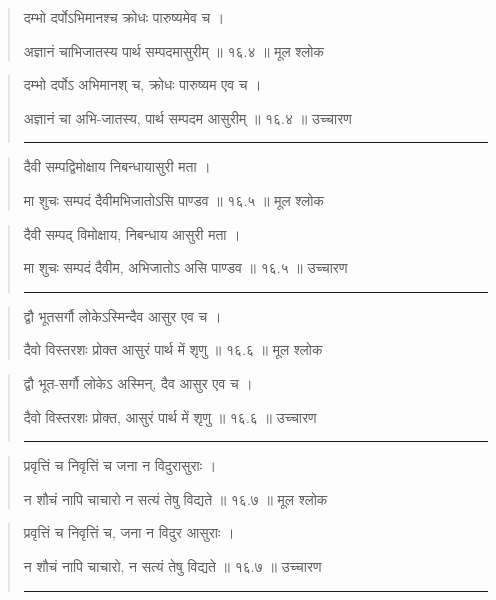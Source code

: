 \begin{quotation}

दम्भो दर्पोऽभिमानश्च क्रोधः पारुष्यमेव च ।  

अज्ञानं चाभिजातस्य पार्थ सम्पदमासुरीम्‌  ॥ १६.४ ॥  मूल श्लोक
\end{quotation}

\begin{quotation}

दम्भो दर्पोऽ अभिमानश् च, क्रोधः पारुष्यम एव च ।  

अज्ञानं चा अभि-जातस्य, पार्थ सम्पदम आसुरीम्‌  ॥ १६.४ ॥  उच्चारण

\noindent\rule{16cm}{0.4pt} 
\end{quotation}


\begin{quotation}

दैवी सम्पद्विमोक्षाय निबन्धायासुरी मता ।  

मा शुचः सम्पदं दैवीमभिजातोऽसि पाण्डव  ॥ १६.५ ॥  मूल श्लोक
\end{quotation}

\begin{quotation}

दैवी सम्पद् विमोक्षाय, निबन्धाय आसुरी मता ।  

मा शुचः सम्पदं दैवीम, अभिजातोऽ असि पाण्डव  ॥ १६.५ ॥  उच्चारण

\noindent\rule{16cm}{0.4pt} 
\end{quotation}


\begin{quotation}
द्वौ भूतसर्गौ लोकेऽस्मिन्दैव आसुर एव च ।  

दैवो विस्तरशः प्रोक्त आसुरं पार्थ में शृणु  ॥ १६.६ ॥  मूल श्लोक
\end{quotation}

\begin{quotation}

द्वौ भूत-सर्गौ लोकेऽ अस्मिन्, दैव आसुर एव च ।  

दैवो विस्तरशः प्रोक्त, आसुरं पार्थ में शृणु  ॥ १६.६ ॥  उच्चारण

\noindent\rule{16cm}{0.4pt} 
\end{quotation}


\begin{quotation}

प्रवृत्तिं च निवृत्तिं च जना न विदुरासुराः ।  

न शौचं नापि चाचारो न सत्यं तेषु विद्यते  ॥ १६.७ ॥  मूल श्लोक
\end{quotation}

\begin{quotation}

प्रवृत्तिं च निवृत्तिं च, जना न विदुर आसुराः ।  

न शौचं नापि चाचारो, न सत्यं तेषु विद्यते  ॥ १६.७ ॥  उच्चारण

\noindent\rule{16cm}{0.4pt} 
\end{quotation}


